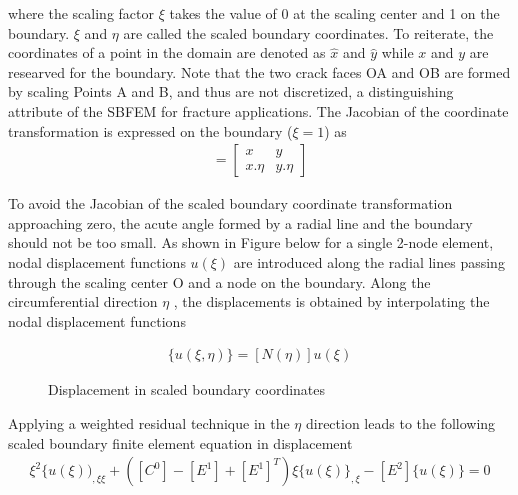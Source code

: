 \documentclass[12pt]{article}
\begin{document}
where the scaling factor $\xi$ takes the value of 0 at the scaling center and 1 on the boundary. $\xi$ and $\eta$ are called the scaled
boundary coordinates. To reiterate, the coordinates of a point in the domain are denoted as $\hat{x}$ and $\hat{y}$ while $x$ and $y$ are researved
for the boundary. Note that the two crack faces OA and OB are formed by scaling Points A and B, and thus are not
discretized, a distinguishing attribute of the SBFEM for fracture applications.
The Jacobian of the coordinate transformation  is expressed on the boundary ($\xi = 1$) as
\begin{align*}
    [J(\eta)] = \begin{bmatrix}
        x & y\\
        x.\eta & y.\eta 
    \end{bmatrix}
\end{align*}

To avoid the Jacobian of the
scaled boundary coordinate transformation approaching zero, the acute angle formed by a radial line and the boundary should not be too small.
As shown in Figure below for a single 2-node element, nodal displacement functions {$u(\xi)$} are introduced along the radial lines
passing through the scaling center O and a node on the boundary. Along the circumferential direction $\eta$ , the displacements is
obtained by interpolating the nodal displacement functions

\begin{align*}
    \{u(\xi, \eta)\} = [N(\eta)]{u(\xi)}
\end{align*}


\begin{figure}[H]
    \centering
    \captionsetup{labelformat=empty}
    \caption{Displacement in scaled boundary coordinates}  
\end{figure}

Applying a weighted residual technique in the $\eta$ direction leads to the following scaled boundary finite element equation in displacement
\begin{align*}
    [E^O]\xi^2\{u(\xi))_{,\xi\xi} + ([C^0] - [E^1] + [E^1]^T)\xi\{u(\xi)\}_{, \xi} - [E^2]\{u(\xi)\} = 0 \tag{23} \label{23}
\end{align*}
\end{document}
